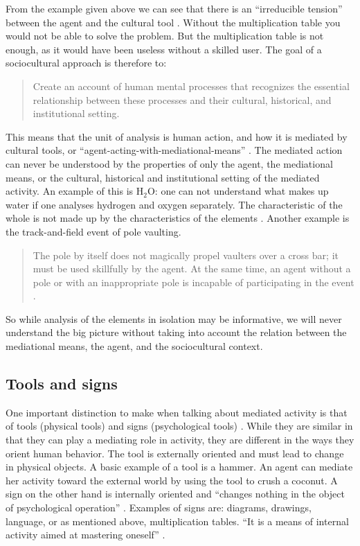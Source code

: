 From the example given above we can see that there is an “irreducible tension” between the agent and the cultural tool \citep{wertsch1998mind}. Without the multiplication table you would not be able to solve the problem. But the multiplication table is not enough, as it would have been useless without a skilled user. The goal of a sociocultural approach is therefore to: 

\begin{quote}
Create an account of human mental processes that recognizes the essential relationship between these processes and their cultural, historical, and institutional setting.\citep{wertsch1998mind} 
\end{quote}

This means that the unit of analysis is human action, and how it is mediated by cultural tools, or “agent-acting-with-mediational-means” \citep[\citealp{wertsch1993sociocultural} cited in][]{wertsch1998mind}. The mediated action can never be understood by the properties of only the agent, the mediational means, or the cultural, historical and institutional setting of the mediated activity. An example of this is $\text{H}_2\text{O}$: one can not understand what makes up water if one analyses hydrogen and oxygen separately. The characteristic of the whole is not made up by the characteristics of the elements \citep{vygotskiui1978mind}. Another example is the track-and-field event of pole vaulting. 
\begin{quote}
The pole by itself does not magically propel vaulters over a cross bar; it must be used skillfully by the agent. At the same time, an agent without a pole or with an inappropriate pole is incapable of participating in the event \citep{wertsch1998mind}. 
\end{quote}
So while analysis of the elements in isolation may be informative, we will never understand the big picture without taking into account the relation between the mediational means, the agent, and the sociocultural context. 

\subsection{Tools and signs}
One important distinction to make when talking about mediated activity is that of tools (physical tools) and signs (psychological tools) \citep{vygotskiui1978mind}. While they are similar in that they can play a mediating role in activity, they are different in the ways they orient human behavior. The tool is externally oriented and must lead to change in physical objects. A basic example of a tool is a hammer. An agent can mediate her activity toward the external world by using the tool to crush a coconut. A sign on the other hand is internally oriented and “changes nothing in the object of psychological operation” \citep{vygotskiui1978mind}. Examples of signs are: diagrams, drawings, language, or as mentioned above, multiplication tables. “It is a means of internal activity aimed at mastering oneself” \citep{vygotskiui1978mind}. 

